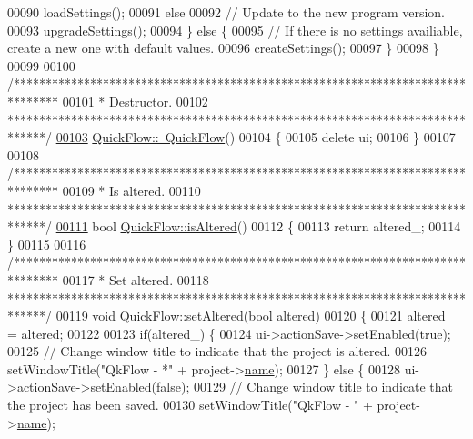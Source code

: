 \begin{DoxyCode}
00090       loadSettings();
00091     \textcolor{keywordflow}{else}
00092       \textcolor{comment}{// Update to the new program version.}
00093       upgradeSettings();
00094   \} \textcolor{keywordflow}{else} \{
00095     \textcolor{comment}{// If there is no settings availiable, create a new one with default values.}
00096     createSettings();
00097   \}
00098 \}
00099 
00100 \textcolor{comment}{/*******************************************************************************}
00101 \textcolor{comment}{ * Destructor.}
00102 \textcolor{comment}{ ******************************************************************************/}
\hypertarget{quickflow_8cpp_source_l00103}{}\hyperlink{group___window_ga985823a0db64246b3a15eed2f397e0a4}{00103} \hyperlink{group___window_ga985823a0db64246b3a15eed2f397e0a4}{QuickFlow::~QuickFlow}()
00104 \{
00105   \textcolor{keyword}{delete} ui;
00106 \}
00107 
00108 \textcolor{comment}{/*******************************************************************************}
00109 \textcolor{comment}{ * Is altered.}
00110 \textcolor{comment}{ ******************************************************************************/}
\hypertarget{quickflow_8cpp_source_l00111}{}\hyperlink{group___window_ga5d9148467ef65c48419bf020ee107a45}{00111} \textcolor{keywordtype}{bool} \hyperlink{group___window_ga5d9148467ef65c48419bf020ee107a45}{QuickFlow::isAltered}()
00112 \{
00113   \textcolor{keywordflow}{return} altered\_;
00114 \}
00115 
00116 \textcolor{comment}{/*******************************************************************************}
00117 \textcolor{comment}{ * Set altered.}
00118 \textcolor{comment}{ ******************************************************************************/}
\hypertarget{quickflow_8cpp_source_l00119}{}\hyperlink{group___window_ga4b63ea5ca52a9eea14db0a22b5a133f8}{00119} \textcolor{keywordtype}{void} \hyperlink{group___window_ga4b63ea5ca52a9eea14db0a22b5a133f8}{QuickFlow::setAltered}(\textcolor{keywordtype}{bool} altered)
00120 \{
00121   altered\_ = altered;
00122 
00123   \textcolor{keywordflow}{if}(altered\_) \{
00124     ui->actionSave->setEnabled(\textcolor{keyword}{true});
00125     \textcolor{comment}{// Change window title to indicate that the project is altered.}
00126     setWindowTitle(\textcolor{stringliteral}{"QkFlow - *"} + project->\hyperlink{class_project_a82dd2d1bc38f9fd08c9a811fcaa76b38}{name});
00127   \} \textcolor{keywordflow}{else} \{
00128     ui->actionSave->setEnabled(\textcolor{keyword}{false});
00129     \textcolor{comment}{// Change window title to indicate that the project has been saved.}
00130     setWindowTitle(\textcolor{stringliteral}{"QkFlow - "} + project->\hyperlink{class_project_a82dd2d1bc38f9fd08c9a811fcaa76b38}{name});

\end{DoxyCode}
